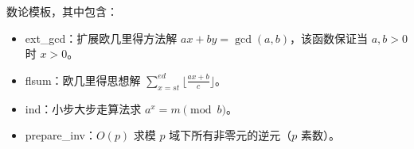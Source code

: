 数论模板，其中包含：
\begin{itemize}
\item ext\_gcd：扩展欧几里得方法解 $ax+by=\gcd(a,b)$，该函数保证当 $a,b>0$ 时 $x>0$。
\item flsum：欧几里得思想解 $\sum_{x=st}^{ed}\lfloor\frac{ax+b}c\rfloor$。
\item ind：小步大步走算法求 $a^x=m\pmod b$。
\item prepare\_inv：$O(p)$ 求模 $p$ 域下所有非零元的逆元（$p$ 素数）。
\end{itemize}
